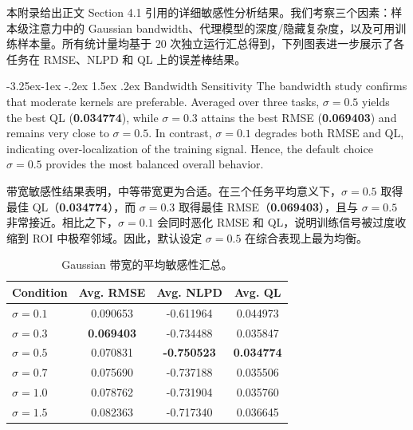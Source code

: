 \documentclass[11pt]{article}
\makeatletter
\renewcommand\subsection{\@startsection{subsection}{2}{\z@}%
	{-3.25ex\@plus -1ex \@minus -.2ex}%
	{1.5ex \@plus .2ex}%
	{\normalfont\fontfamily{phv}\fontsize{14}{17}\bfseries}}
\makeatother
\begin{document}
	本附录给出正文 Section 4.1 引用的详细敏感性分析结果。我们考察三个因素：样本级注意力中的 Gaussian bandwidth、代理模型的深度/隐藏复杂度，以及可用训练样本量。所有统计量均基于 20 次独立运行汇总得到，下列图表进一步展示了各任务在 RMSE、NLPD 和 QL 上的误差棒结果。

	\subsection{Bandwidth Sensitivity} \label{app:E1}
	The bandwidth study confirms that moderate kernels are preferable. Averaged over three tasks, $\sigma=0.5$ yields the best QL (\textbf{0.034774}), while $\sigma=0.3$ attains the best RMSE (\textbf{0.069403}) and remains very close to $\sigma=0.5$. In contrast, $\sigma=0.1$ degrades both RMSE and QL, indicating over-localization of the training signal. Hence, the default choice $\sigma=0.5$ provides the most balanced overall behavior.

	带宽敏感性结果表明，中等带宽更为合适。在三个任务平均意义下，$\sigma=0.5$ 取得最佳 QL（\textbf{0.034774}），而 $\sigma=0.3$ 取得最佳 RMSE（\textbf{0.069403}），且与 $\sigma=0.5$ 非常接近。相比之下，$\sigma=0.1$ 会同时恶化 RMSE 和 QL，说明训练信号被过度收缩到 ROI 中极窄邻域。因此，默认设定 $\sigma=0.5$ 在综合表现上最为均衡。

	\begin{table}[htbp]
		\centering
		\caption{Average sensitivity summary for Gaussian bandwidth.}
		\caption*{Gaussian 带宽的平均敏感性汇总。}
		\label{tab:sigma_sensitivity_avg}
		\begin{tabular}{lccc}
			\toprule
			Condition & Avg. RMSE & Avg. NLPD & Avg. QL \\
			\midrule
			$\sigma=0.1$ & 0.090653 & -0.611964 & 0.044973 \\
			$\sigma=0.3$ & \textbf{0.069403} & -0.734488 & 0.035847 \\
			$\sigma=0.5$ & 0.070831 & \textbf{-0.750523} & \textbf{0.034774} \\
			$\sigma=0.7$ & 0.075690 & -0.737188 & 0.035506 \\
			$\sigma=1.0$ & 0.078762 & -0.731904 & 0.035760 \\
			$\sigma=1.5$ & 0.082363 & -0.717340 & 0.036645 \\
			\bottomrule
		\end{tabular}
	\end{table}
\end{document}
